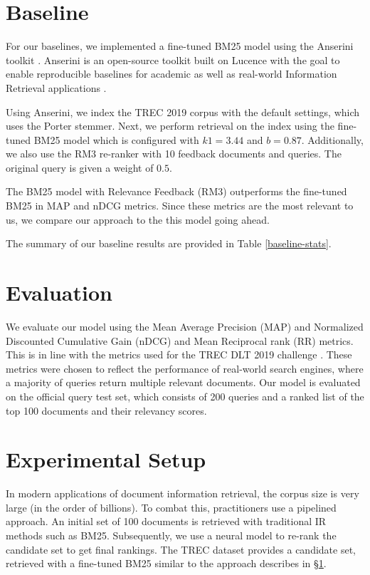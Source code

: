 \documentclass[sigconf, nonacm=true]{acmart}
\begin{document}
\section{Baseline} \label{baseline}

For our baselines, we implemented a fine-tuned BM25 model using the Anserini toolkit \cite{Yang2018AnseriniRR}. Anserini is an open-source toolkit built on Lucence \cite{Yang2017AnseriniET} with the goal to enable reproducible baselines for academic as well as real-world Information Retrieval applications \cite{10.1145/3239571}.

Using Anserini, we index the TREC 2019 corpus with the default settings, which uses the Porter stemmer. Next, we perform retrieval on the index using the fine-tuned BM25 model which is configured with $k1 = 3.44$ and $b = 0.87$. Additionally, we also use the RM3 re-ranker with 10 feedback documents and queries. The original query is given a weight of $0.5$.

The BM25 model with Relevance Feedback (RM3) outperforms the fine-tuned BM25 in MAP and nDCG metrics. Since these metrics are the most relevant to us, we compare our approach to the this model going ahead.

The summary of our baseline results are provided in Table \ref{baseline-stats}.

\section{Evaluation} \label{evaluation}

We evaluate our model using the Mean Average Precision (MAP) and Normalized Discounted Cumulative Gain (nDCG) and Mean Reciprocal rank (RR) metrics. This is in line with the metrics used for the TREC DLT 2019 challenge \cite{Craswell2020OverviewOT}. These metrics were chosen to reflect the performance of real-world search engines, where a majority of queries return multiple relevant documents. Our model is evaluated on the official query test set, which consists of 200 queries and a ranked list of the top 100 documents and their relevancy scores.

\section{Experimental Setup} \label{experiments}

In modern applications of document information retrieval, the corpus size is very large (in the order of billions). To combat this, practitioners use a pipelined approach. An initial set of 100 documents is retrieved with traditional IR methods such as BM25. Subsequently, we use a neural model to re-rank the candidate set to get final rankings. The TREC dataset provides a candidate set, retrieved with a fine-tuned BM25 similar to the approach describes in \S \ref{baseline}.
\end{document}
